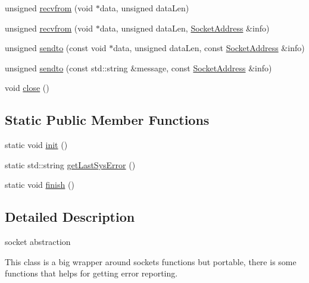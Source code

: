 \begin{DoxyCompactItemize}
\item 
unsigned \hyperlink{a00062_a9d410fd1fb0fabfb2858cb196908ba8e}{recvfrom} (void $\ast$data, unsigned data\-Len)
\item 
unsigned \hyperlink{a00062_af92523a1f551450626971e67cd21f3d5}{recvfrom} (void $\ast$data, unsigned data\-Len, \hyperlink{a00063}{Socket\-Address} \&info)
\item 
unsigned \hyperlink{a00062_a195a05bc6e6d7f68180d59e65d3d2dca}{sendto} (const void $\ast$data, unsigned data\-Len, const \hyperlink{a00063}{Socket\-Address} \&info)
\item 
unsigned \hyperlink{a00062_af5b903db5ed0c9f40d7e53a0b8e0b444}{sendto} (const std\-::string \&message, const \hyperlink{a00063}{Socket\-Address} \&info)
\item 
void \hyperlink{a00062_a80d4cf181b6894cf9fefef25854098e7}{close} ()
\end{DoxyCompactItemize}
\subsection*{Static Public Member Functions}
\begin{DoxyCompactItemize}
\item 
static void \hyperlink{a00062_a14e1832d3a02d68de3bef8141737e057}{init} ()
\item 
static std\-::string \hyperlink{a00062_aa843eb2f07454880bcee46c5efc0d3a4}{get\-Last\-Sys\-Error} ()
\item 
static void \hyperlink{a00062_a9cbfc6507b16bb45d5580ed70d31e758}{finish} ()
\end{DoxyCompactItemize}


\subsection{Detailed Description}
socket abstraction 

This class is a big wrapper around sockets functions but portable, there is some functions that helps for getting error reporting. 

